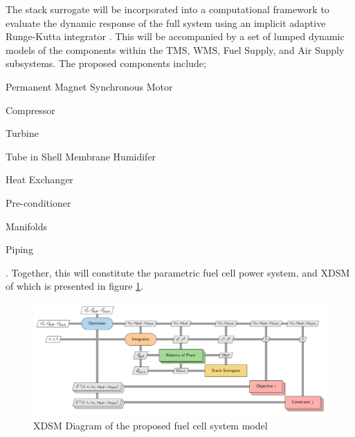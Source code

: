 The stack surrogate will be incorporated into a computational framework to evaluate the dynamic response of the full system using an implicit adaptive Runge-Kutta integrator \cite{SolvingOrdinaryDifferential}.
This will be accompanied by a set of lumped dynamic models of the components within the TMS, WMS, Fuel Supply, and Air Supply subsystems.
The proposed components include; \begin{enumerate*} 	\item Permanent Magnet Synchronous Motor
	\item Compressor
	\item Turbine
	\item Tube in Shell Membrane Humidifer
	\item Heat Exchanger
	\item Pre-conditioner
	\item Manifolds
	\item Piping
\end{enumerate*}. Together, this will constitute the parametric fuel cell power system, and XDSM of which is presented  in figure \ref{fig:xdsm}.
\begin{center}
	\begin{figure}
		\includegraphics[width=\linewidth]{figures/xdsm.pdf}
		\caption{XDSM Diagram of the proposed fuel cell system model}
		\label{fig:xdsm}
	\end{figure}
\end{center}

